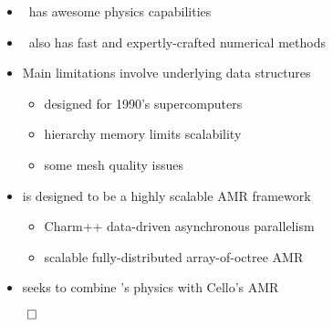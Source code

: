 


\begin{frame}[fragile,label=ss-intro-summary] 
\secframetitle{\ssIntroSummary}

\begin{itemize}
\item \enzo\  has awesome physics capabilities
\item \enzo\  also has fast and expertly-crafted numerical methods
\item Main limitations involve underlying data structures
  \begin{itemize}
  \item designed for 1990's supercomputers
  \item hierarchy memory limits scalability
  \item some mesh quality issues
  \end{itemize}
\item {} is designed to be a highly scalable AMR framework
  \begin{itemize}
  \item Charm++ data-driven asynchronous parallelism
  \item scalable fully-distributed array-of-octree AMR
  \end{itemize}
\item {} seeks to combine \enzo's physics with Cello's AMR
\end{itemize}
\vfill
\centerline{$\qed$}
\end{frame}


